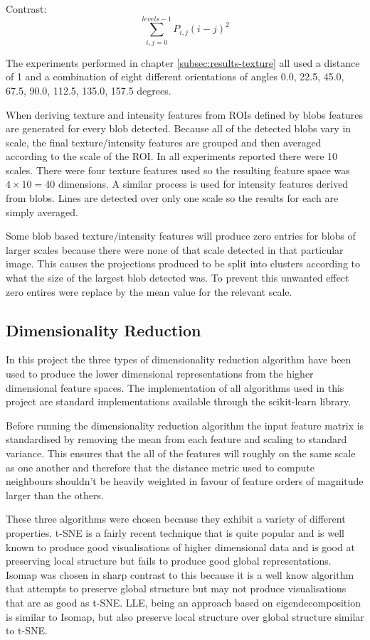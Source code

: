 Contrast:
\begin{equation}
	\sum\limits_{i,j=0}^{levels-1} P_{i,j}(i-j)^2
\end{equation}

The experiments performed in chapter \ref{subsec:results-texture} all used a distance of 1 and a combination of eight different orientations of angles 0.0, 22.5, 45.0, 67.5, 90.0, 112.5, 135.0, 157.5 degrees.

When deriving texture and intensity features from ROIs defined by blobs features are generated for every blob detected. Because all of the detected blobs vary in scale, the final texture/intensity features are grouped and then averaged according to the scale of the ROI. In all experiments reported there were 10 scales. There were four texture features used so the resulting feature space was $4 \times 10 = 40$ dimensions. A similar process is used for intensity features derived from blobs. Lines are detected over only one scale so the results for each are simply averaged.

Some blob based texture/intensity features will produce zero entries for blobs of larger scales because there were none of that scale detected in that particular image. This causes the projections produced to be split into clusters according to what the size of the largest blob detected was. To prevent this unwanted effect zero entires were replace by the mean value for the relevant scale.

\subsection{Dimensionality Reduction}
In this project the three types of dimensionality reduction algorithm have been used to produce the lower dimensional representations from the higher dimensional feature spaces. The implementation of all algorithms used in this project are standard implementations available through the scikit-learn library.

Before running the dimensionality reduction algorithm the input feature matrix is standardised by removing the mean from each feature and scaling to standard variance. This ensures that the all of the features will roughly on the same scale as one another and therefore that the distance metric used to compute neighbours shouldn't be heavily weighted in favour of feature orders of magnitude larger than the others.

These three algorithms were chosen because they exhibit a variety of different properties. t-SNE is a fairly recent technique that is quite popular and is well known to produce good visualisations of higher dimensional data and is good at preserving local structure but fails to produce good global representations. Isomap was chosen in sharp contrast to this because it is a well know algorithm that attempts to preserve global structure but may not produce visualisations that are as good as t-SNE. LLE, being an approach based on eigendecomposition is similar to Isomap, but also preserve local structure over global structure similar to t-SNE. 

